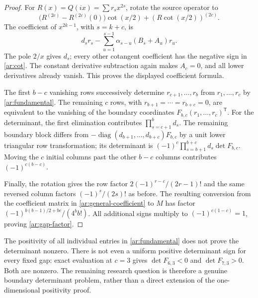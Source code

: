 \begin{proof}
For $R(x)=Q(ix)=\sum r_sx^{2s}$, rotate the source operator to
\[
 \bigl(R^{(2c)}-R^{(2c)}(0)\bigr)\cot(x/2)
        +(R\cot(x/2))^{(2c)}.
\]
The coefficient of $x^{2k-1}$, with $s=k+c$, is
\begin{equation}\label{ar:general-coefficient}
       d_sr_s-\sum_{u=1}^{s-1}\alpha_{s-u}(B_s+A_u)r_u.
\end{equation}
The pole $2/x$ gives $d_s$; every other cotangent coefficient has
the negative sign in \eqref{ar:cot}. The constant derivative
subtraction again makes $A_c=0$, and all lower derivatives already
vanish. This proves the displayed coefficient formula.

The first $b-c$ vanishing rows successively determine
$r_{c+1},\ldots,r_b$ from $r_1,\ldots,r_c$ by
\eqref{ar:fundamental}. The remaining $c$ rows, with
$r_{b+1}=\cdots=r_{b+c}=0$, are equivalent to the vanishing of
the boundary coordinates $F_{b,c}(r_1,\ldots,r_c)^{\mathsf T}$.
For the determinant, the first elimination contributes
$\prod_{s=c+1}^bd_s$. The remaining boundary block differs from
$-\operatorname{diag}(d_{b+1},\ldots,d_{b+c})F_{b,c}$ by a
unit lower triangular row transformation; its determinant is
$(-1)^c\prod_{s=b+1}^{b+c}d_s\det F_{b,c}$.
Moving the $c$ initial columns past the other $b-c$ columns contributes
$(-1)^{c(b-c)}$.

Finally, the rotation gives the row factor
$2(-1)^{r-c}/(2r-1)!$ and the same reversed column factors
$(-1)^s/(2s)!$ as before. The resulting conversion from the
coefficient matrix in \eqref{ar:general-coefficient} to $M$ has
factor $(-1)^{b(b-1)/2+bc}/(4^bb!)$. All additional signs multiply
to $(-1)^{c(1-c)}=1$, proving \eqref{ar:gap-factor}.
\end{proof}

The positivity of all individual entries in \eqref{ar:fundamental}
does not prove the determinant nonzero. There is not even a uniform
positive determinant sign for every fixed gap: exact evaluation at
$c=3$ gives $\det F_{6,3}<0$ and $\det F_{7,3}>0$. Both are nonzero.
The remaining research question is therefore a genuine boundary
determinant problem, rather than a direct extension of the one-dimensional
positivity proof.
